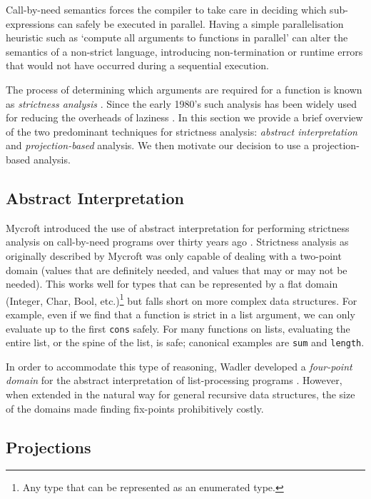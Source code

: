 Call-by-need semantics forces the compiler to take care in deciding which
sub-expressions can safely be executed in parallel.  Having a simple
parallelisation heuristic such as `compute all arguments to functions in
parallel' can alter the semantics of a non-strict language, introducing
non-termination or runtime errors that would not have occurred during a
sequential execution.


The process of determining which arguments are required for a function is known
as \emph{strictness analysis} \citep{mycroft1980theory}. Since the early 1980's
such analysis has been widely used for reducing the overheads of laziness
\citep{spjDemand}. In this section we provide a brief overview of the two
predominant techniques for strictness analysis: \emph{abstract interpretation}
and \emph{projection-based} analysis.  We then motivate our decision to use a
projection-based analysis.

\subsection{Abstract Interpretation}

Mycroft introduced the use of abstract interpretation for performing strictness
analysis on call-by-need programs over thirty years ago
\citep{mycroft1980theory}.
Strictness analysis as originally described by Mycroft was only capable of
dealing with a two-point domain (values that are definitely needed, and values
that may or may not be needed). This works well for types that can be
represented by a flat domain (Integer, Char, Bool, etc.)\footnote{Any type that
can be represented as an enumerated type.} but falls short on more complex data
structures. For example, even if we find that a function is strict in a list
argument, we can only evaluate up to the first \verb'cons' safely. For many
functions on lists, evaluating the entire list, or the spine of the list, is
safe; canonical examples are \verb'sum' and \verb'length'.

In order to accommodate this type of reasoning, Wadler developed a
\emph{four-point domain} for the abstract interpretation of list-processing
programs \citep{wadler1987strictness}. However, when extended in the natural way
for general recursive data structures, the size of the domains made finding
fix-points prohibitively costly.

\subsection{Projections}

